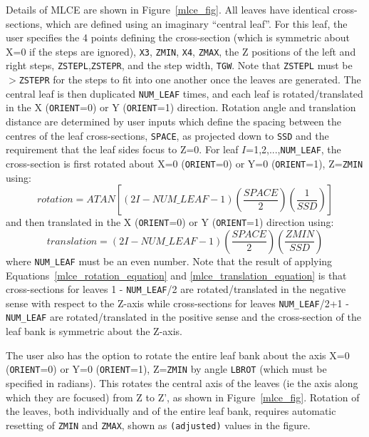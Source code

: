 \documentclass[12pt,twoside]{article}
\begin{document}
Details of MLCE are shown in Figure~\ref{mlce_fig}.  All leaves have
identical cross-sections, which are defined using an imaginary
``central leaf''.  For this leaf,
the user specifies the 4 points defining the cross-section (which is symmetric
about X=0 if the steps are ignored),
{\tt X3}, {\tt ZMIN}, {\tt X4}, {\tt ZMAX}, the Z positions of the left and right
steps, {\tt ZSTEPL},{\tt ZSTEPR}, and the step width, {\tt TGW}.   Note that
{\tt ZSTEPL} must be $>${\tt ZSTEPR} for the steps to fit into one another
once the leaves are generated.  The central leaf is then duplicated
{\tt NUM\_LEAF} times, and each leaf is rotated/translated in the
X ({\tt ORIENT}=0) or Y ({\tt ORIENT}=1) direction.
Rotation angle and translation distance are determined by user
inputs which define the spacing between the
centres of the leaf cross-sections, {\tt SPACE},
as projected down to {\tt SSD} and the requirement that the leaf sides
focus to Z=0.   For leaf $I$=1,2,...,{\tt NUM\_LEAF}, the cross-section
is first rotated about X=0 ({\tt ORIENT}=0)
or Y=0 ({\tt ORIENT}=1), Z={\tt ZMIN} using:
\begin{equation}
rotation=
ATAN\left[\left(2I-NUM\_LEAF-1\right)\left(\frac{SPACE}{2}\right)\left(\frac{1}{SSD}\right)\right]
\label{mlce_rotation_equation}
\end{equation}
and then translated in the X ({\tt ORIENT}=0) or Y
({\tt ORIENT}=1) direction using:
\begin{equation}
translation=
\left(2I-NUM\_LEAF-1\right)\left(\frac{SPACE}{2}\right)\left(\frac{ZMIN}{SSD}\right)
\label{mlce_translation_equation}
\end{equation}
where {\tt NUM\_LEAF} must be an even number.  Note that the result of
applying Equations~\ref{mlce_rotation_equation} and \ref{mlce_translation_equation} is that cross-sections for
leaves 1 - {\tt NUM\_LEAF}/2 are rotated/translated in the negative sense with respect to the Z-axis
while cross-sections for leaves {\tt NUM\_LEAF}/2+1 - {\tt NUM\_LEAF} are rotated/translated in the positive
sense and the cross-section of the leaf bank is symmetric about the Z-axis.

The user also has
the option to rotate the entire leaf bank about the axis
X=0 ({\tt ORIENT}=0) or Y=0 ({\tt ORIENT}=1), Z={\tt ZMIN} by angle
{\tt LBROT} (which must be specified in radians).  This rotates the
central axis of the leaves (ie the axis along which they are focused) from
Z to Z', as shown in Figure~\ref{mlce_fig}.  Rotation of the leaves,
both individually and of the entire leaf bank, requires automatic resetting
of {\tt ZMIN} and {\tt ZMAX}, shown as {\tt (adjusted)} values in the figure.
\end{document}

